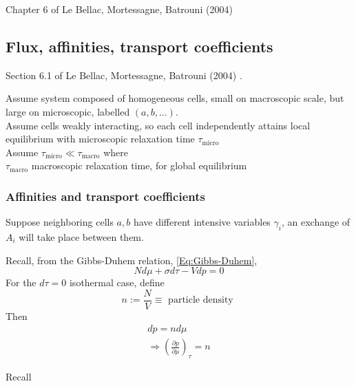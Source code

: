 \documentclass[10pt]{amsart}
\begin{document}
\begin{multicols*}{2}
Chapter 6 of Le Bellac, Mortessagne, Batrouni (2004) \cite{MLeBellacFMortessagneGBatrouni2004}

\subsection{Flux, affinities, transport coefficients}

Section 6.1 of Le Bellac, Mortessagne, Batrouni (2004) \cite{MLeBellacFMortessagneGBatrouni2004}. 

Assume system composed of homogeneous cells, small on macroscopic scale, but large on microscopic, labelled $(a,b,\dots )$.  \\
Assume cells weakly interacting, so each cell independently attains local equilibrium with microscopic relaxation time $\tau_{\text{micro}}$ \\
Assume $\tau_{\text{micro}} \ll \tau_{\text{macro}}$ where \\
\phantom{Assume } $\tau_{\text{macro}}$ macroscopic relaxation time, for global equilibrium 










\subsubsection{Affinities and transport coefficients}

Suppose neighboring cells $a,b$ have different intensive variables $\gamma_i$, an exchange of $A_i$ will take place between them.








Recall, from the Gibbs-Duhem relation, \ref{Eq:Gibbs-Duhem},
\[
N d\mu + \sigma d\tau -Vdp = 0 
\]
For the $d\tau =0$ isothermal case, define
\begin{equation}
n := \frac{N}{V} \equiv \text{ particle density }
\end{equation}
Then 
\begin{equation}
\begin{gathered}
  dp = n d\mu \\ 
  \Longrightarrow \boxed{ \left( \frac{ \partial p }{ \partial \mu } \right)_{\tau} = n }
\end{gathered}
\end{equation}


Recall




\end{multicols*}
\end{document}

